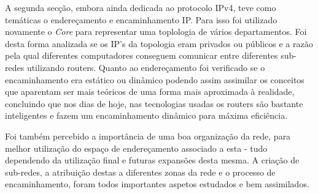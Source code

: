 \documentclass[a4paper]{article}
\begin{document}
 A segunda secção, embora ainda dedicada ao protocolo IPv4, teve como temáticas o endereçamento e encaminhamento IP. Para isso foi utilizado novamente o \textit{Core} para representar uma toplologia de vários departamentos. Foi desta forma analizada se os IP's da topologia eram privados ou públicos e a razão pela qual diferentes computadores conseguem comunicar entre diferentes sub-redes utilizando routers. Quanto ao endereçamento foi verificado se o encaminhamento era estático ou dinâmico podendo assim assimilar os conceitos que aparentam ser mais teóricos de uma forma mais aproximada à realidade, concluindo que nos dias de hoje, nas tecnologias usadas os routers são bastante inteligentes e fazem um encaminhamento dinâmico para máxima eficiência.\newline
 
 Foi também percebido a importância de uma boa organização da rede, para melhor utilização do espaço de endereçamento associado a esta - tudo dependendo da utilização final e futuras expansões desta mesma. A criação de sub-redes, a atribuição destas a diferentes zonas da rede e o processo de encaminhamento, foram todos importantes aspetos estudados e bem assimilados.
\end{document}
